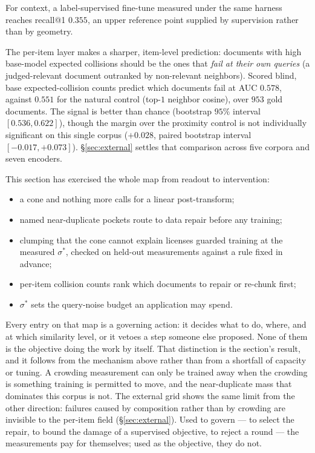 \documentclass[11pt,letterpaper]{article}
\newcommand{\sstar}{\sigma^{*}}
\begin{document}
For context, a label-supervised
fine-tune measured under the same harness reaches recall@1 $0.355$, an
upper reference point supplied by supervision rather than by geometry.

The per-item layer makes a sharper, item-level prediction: documents with
high base-model expected collisions should be the ones that \emph{fail at
their own queries} (a judged-relevant document outranked by non-relevant
neighbors). Scored blind, base expected-collision counts predict which
documents fail at AUC $0.578$, against $0.551$ for the natural control
(top-$1$ neighbor cosine), over $953$ gold documents. The signal is better
than chance (bootstrap $95\%$ interval $[0.536, 0.622]$), though the
margin over the proximity control is not individually significant on this
single corpus ($+0.028$, paired bootstrap interval $[-0.017, +0.073]$).
\S\ref{sec:external} settles that comparison across five corpora and seven
encoders.

This section has exercised the whole map from readout to intervention:
\begin{itemize}
\item a cone and nothing more calls for a linear post-transform;
\item named near-duplicate pockets route to data repair before any
  training;
\item clumping that the cone cannot explain licenses guarded training at
  the measured $\sstar$, checked on held-out measurements against a rule
  fixed in advance;
\item per-item collision counts rank which documents to repair or
  re-chunk first;
\item $\sstar$ sets the query-noise budget an application may spend.
\end{itemize}
Every entry on that map is a governing action: it decides what to do,
where, and at which similarity level, or it vetoes a step someone else
proposed. None
of them is the objective doing the work by itself. That distinction is
the section's result, and it follows from the mechanism above rather than
from a shortfall of capacity or tuning. A crowding measurement can only
be trained away when the crowding is something training is permitted to
move, and the near-duplicate mass that dominates this corpus is not. The
external grid shows the same limit from the other direction: failures
caused by composition rather than by crowding are invisible to the
per-item field (\S\ref{sec:external}). Used to govern --- to select
the repair, to bound the damage of a supervised objective, to reject a
round --- the measurements pay for themselves; used as the objective,
they do not.
\end{document}
